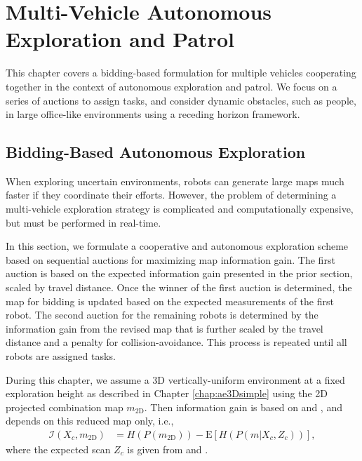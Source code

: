 
\chapter{Multi-Vehicle Autonomous Exploration and Patrol} \label{chap:multivehicle}

This chapter covers a bidding-based formulation for multiple vehicles cooperating together in the context of autonomous exploration and patrol. We focus on a series of auctions to assign tasks, and consider dynamic obstacles, such as people, in large office-like environments using a receding horizon framework.

\section{Bidding-Based Autonomous Exploration}
\label{sec:BiddingExploration}

When exploring uncertain environments, robots can generate large maps much faster if they coordinate their efforts. However, the problem of determining a multi-vehicle exploration strategy is complicated and computationally expensive, but must be performed in real-time.

In this section, we formulate a cooperative and autonomous exploration scheme based on sequential auctions for maximizing map information gain. The first auction is based on the expected information gain presented in the prior section, scaled by travel distance. Once the winner of the first auction is determined, the map for bidding is updated based on the expected measurements of the first robot. The second auction for the remaining robots is determined by the information gain from the revised map that is further scaled by the travel distance and a penalty for collision-avoidance. This process is repeated until all robots are assigned tasks. 

During this chapter, we assume a 3D vertically-uniform environment at a fixed exploration height as described in Chapter \ref{chap:ae3Dsimple} using the 2D projected combination map $ m_\text{2D}$. Then information gain is based on  and , and depends on this reduced map only, i.e.,
\begin{align}
\label{eqn:expectedInfoGainMap2D}
\mathcal I(X_c,m_\text{2D})&=H(P(m_\text{2D}))-\text{E}\left[H(P(m|X_c,Z_c))\right],
\end{align}
where the expected scan $Z_c$ is given from  and .


